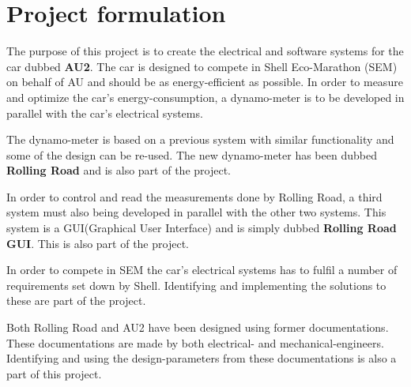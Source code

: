\chapter{Project formulation}
The purpose of this project is to create the electrical and software systems for the car dubbed \textbf{AU2}. The car is designed to compete in Shell Eco-Marathon (SEM) on behalf of AU and should be as energy-efficient as possible. In order to measure and optimize the car's energy-consumption, a dynamo-meter is to be developed in parallel with the car's electrical systems. 

The dynamo-meter is based on a previous system with similar functionality\cite{BAC_rullefelt} and some of the design can be re-used. The new dynamo-meter has been dubbed \textbf{Rolling Road} and is also part of the project.

In order to control and read the measurements done by Rolling Road, a third system must also being developed in parallel with the other two systems. This system is a GUI(Graphical User Interface) and is simply dubbed \textbf{Rolling Road GUI}. This is also part of the project.

In order to compete in SEM the car's electrical systems has to fulfil a number of requirements set down by Shell\cite{AU2}. Identifying and implementing the solutions to these are part of the project.

Both Rolling Road and AU2 have been designed using former documentations\cite{BAC_rullefelt}\cite{BAC_zenith33}. These documentations are made by both electrical- and mechanical-engineers. Identifying and using the design-parameters from these documentations is also a part of this project.

\newpage
